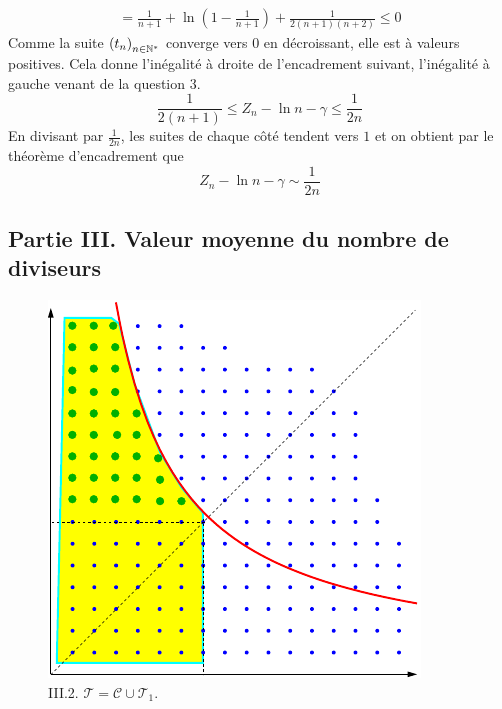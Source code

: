 \begin{enumerate}
\begin{multline*}
= \frac{1}{n+1}+\ln\left(1-\frac{1}{n+1}\right)+\frac{1}{2(n+1)(n+2)}\leq 0 
\end{multline*}
Comme la suite $\left(t_n \right)_{n\in\mathbb{N}^*}$ converge vers $0$ en décroissant, elle est à valeurs positives. Cela donne l'inégalité à droite de l'encadrement suivant, l'inégalité à gauche venant de la question 3.
\begin{displaymath}
 \frac{1}{2(n+1)}\leq Z_n - \ln n -\gamma \leq \frac{1}{2n}
\end{displaymath}
En divisant par $\frac{1}{2n}$, les suites de chaque côté tendent vers $1$ et on obtient par le théorème d'encadrement que
\begin{displaymath}
  Z_n - \ln n -\gamma \sim \frac{1}{2n}
\end{displaymath}

\end{enumerate}

\subsection*{Partie III. Valeur moyenne du nombre de diviseurs}
\begin{figure}[ht]
 \centering
 \includegraphics{Cthean_1.pdf}
 \caption{III.2. $\mathcal T = \mathcal C \cup \mathcal T_1$.}
 \label{fig:Cthean_1}
\end{figure}

